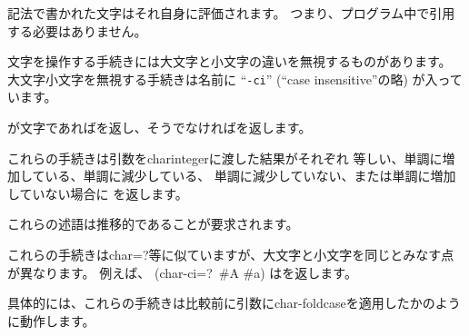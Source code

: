 \sharpsign\backwhack{} 記法で書かれた文字はそれ自身に評価されます。
つまり、プログラム中で引用する必要はありません。

\vest 文字を操作する手続きには大文字と小文字の違いを無視するものがあります。
大文字小文字を無視する手続きは名前に
\hbox{``{\tt -ci}''} (``case insensitive''の略) が入っています。


\begin{entry}{%
}

が文字であれば\schtrue{}を返し、そうでなければ\schfalse{}を返します。

\end{entry}


\begin{entry}{%
}

\label{characterequality}

これらの手続きは引数を{\cf char\coerce{}integer}に渡した結果がそれぞれ
等しい、単調に増加している、単調に減少している、
単調に減少していない、または単調に増加していない場合に
\schtrue{}を返します。

これらの述語は推移的であることが要求されます。

\end{entry}


\begin{entry}{%
}

これらの手続きは{\cf char=?}等に似ていますが、大文字と小文字を同じとみなす点が異なります。
例えば、 {\cf (char-ci=?\ \#\backwhack{}A \#\backwhack{}a)} は\schtrue{}を返します。

具体的には、これらの手続きは比較前に引数に{\cf char-foldcase}を適用したかのように動作します。

\end{entry}



